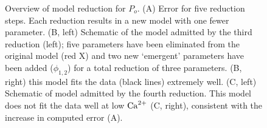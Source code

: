 \documentclass{article}
\newcommand\po{P_o}
\newcommand\ca{\rm{Ca}^{2+}}
\edef\CaSTR{{0.0um}/0,{0.7um}/0.7,{4.0um}/4,{12.0um}/12,{22.0um}/22,{55.0um}/55,{70.0um}/70,{95.0um}/95}
\begin{document}
\begin{figure}
\begin{subfigure}[b]{0.48\linewidth}
{
}
\end{subfigure}

\caption{Overview of model reduction for $\po.$ (A) Error for five reduction steps.  Each reduction results in a new model with one fewer parameter.  (B, left) Schematic of the model admitted by the third reduction (left); five parameters have been eliminated from the original model (red X) and two new `emergent' parameters have been added ($\phi_{1,2}$) for a total reduction of three parameters.  (B, right) this model fits the data (black lines) extremely well.  (C, left) Schematic of model admitted by the fourth reduction.  This model does not fit the data well at low $\ca$ (C, right), consistent with the increase in computed error (A).}

\end{figure}


\pagebreak

\end{document}
